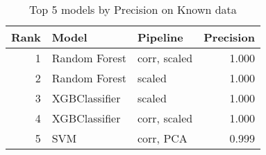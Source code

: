 \begin{table}[!htb]
\caption{Top 5 models by Precision on Known data}
\label{table-top-5-precision-known}
\centering
\begin{tabular}{rllr}
\toprule
Rank & Model & Pipeline & Precision \\
\midrule
1 & Random Forest & corr, scaled & 1.000 \\
2 & Random Forest & scaled & 1.000 \\
3 & XGBClassifier & scaled & 1.000 \\
4 & XGBClassifier & corr, scaled & 1.000 \\
5 & SVM & corr, PCA & 0.999 \\
\bottomrule
\end{tabular}
\end{table}
